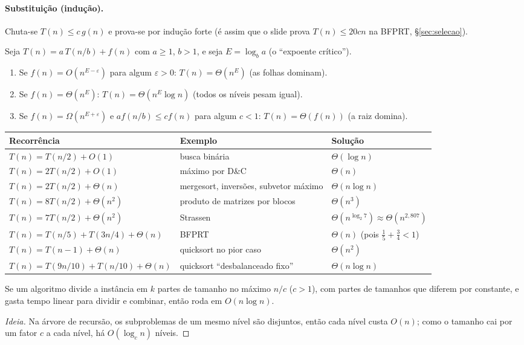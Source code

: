 \paragraph{Substituição (indução).} Chuta-se $T(n)\le c\,g(n)$ e prova-se por indução forte (é assim que o slide prova $T(n)\le 20cn$ na BFPRT, §\ref{sec:selecao}).

\begin{teo}
Seja $T(n)=a\,T(n/b)+f(n)$ com $a\ge1$, $b>1$, e seja $E=\log_b a$ (o ``expoente crítico'').
\begin{enumerate}
  \item Se $f(n)=O(n^{E-\varepsilon})$ para algum $\varepsilon>0$: $T(n)=\Theta(n^{E})$ \quad(as folhas dominam).
  \item Se $f(n)=\Theta(n^{E})$: $T(n)=\Theta(n^{E}\log n)$ \quad(todos os níveis pesam igual).
  \item Se $f(n)=\Omega(n^{E+\varepsilon})$ e $a f(n/b)\le c f(n)$ para algum $c<1$: $T(n)=\Theta(f(n))$ \quad(a raiz domina).
\end{enumerate}
\end{teo}
\begin{center}
\small
\begin{tabular}{@{}lll@{}}
\toprule
Recorrência & Exemplo & Solução\\
\midrule
$T(n)=T(n/2)+O(1)$ & busca binária & $\Theta(\log n)$\\
$T(n)=2T(n/2)+O(1)$ & máximo por D\&C & $\Theta(n)$\\
$T(n)=2T(n/2)+\Theta(n)$ & mergesort, inversões, subvetor máximo & $\Theta(n\log n)$\\
$T(n)=8T(n/2)+\Theta(n^2)$ & produto de matrizes por blocos & $\Theta(n^3)$\\
$T(n)=7T(n/2)+\Theta(n^2)$ & Strassen & $\Theta(n^{\log_2 7})\approx\Theta(n^{2{,}807})$\\
$T(n)=T(n/5)+T(3n/4)+\Theta(n)$ & BFPRT & $\Theta(n)$ (pois $\tfrac15+\tfrac34<1$)\\
$T(n)=T(n-1)+\Theta(n)$ & quicksort no pior caso & $\Theta(n^2)$\\
$T(n)=T(9n/10)+T(n/10)+\Theta(n)$ & quicksort ``desbalanceado fixo'' & $\Theta(n\log n)$\\
\bottomrule
\end{tabular}
\end{center}

\begin{teo}
Se um algoritmo divide a instância em $k$ partes de tamanho no máximo $n/c$ ($c>1$), com partes de tamanhos que diferem por constante, e gasta tempo linear para dividir e combinar, então roda em $O(n\log n)$.
\end{teo}
\begin{proof}[Ideia]
Na árvore de recursão, os subproblemas de um mesmo nível são disjuntos, então cada nível custa $O(n)$; como o tamanho cai por um fator $c$ a cada nível, há $O(\log_c n)$ níveis.
\end{proof}

